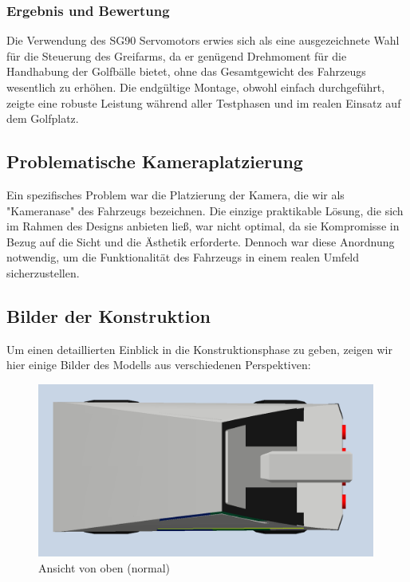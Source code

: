 \subsubsection{Ergebnis und Bewertung}
Die Verwendung des SG90 Servomotors erwies sich als eine ausgezeichnete Wahl für die Steuerung des Greifarms, da er genügend Drehmoment für die Handhabung der Golfbälle bietet, ohne das Gesamtgewicht des Fahrzeugs wesentlich zu erhöhen. Die endgültige Montage, obwohl einfach durchgeführt, zeigte eine robuste Leistung während aller Testphasen und im realen Einsatz auf dem Golfplatz.

\subsection{Problematische Kameraplatzierung}
Ein spezifisches Problem war die Platzierung der Kamera, die wir als "Kameranase" des Fahrzeugs bezeichnen. Die einzige praktikable Lösung, die sich im Rahmen des Designs anbieten ließ, war nicht optimal, da sie Kompromisse in Bezug auf die Sicht und die Ästhetik erforderte. Dennoch war diese Anordnung notwendig, um die Funktionalität des Fahrzeugs in einem realen Umfeld sicherzustellen.

\subsection{Bilder der Konstruktion}
Um einen detaillierten Einblick in die Konstruktionsphase zu geben, zeigen wir hier einige Bilder des Modells aus verschiedenen Perspektiven:

\newpage

\begin{figure}[h]
    \centering
    \includegraphics[width=0.99\textwidth]{Resources/oben_normal.png}
    \caption{Ansicht von oben (normal)}
\end{figure}

